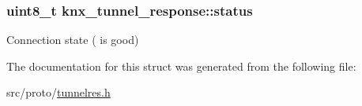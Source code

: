 \subsubsection[{\texorpdfstring{status}{status}}]{\setlength{\rightskip}{0pt plus 5cm}uint8\+\_\+t knx\+\_\+tunnel\+\_\+response\+::status}\hypertarget{structknx__tunnel__response_ac646034c64b6083aa21e49c22e1d0e50}{}\label{structknx__tunnel__response_ac646034c64b6083aa21e49c22e1d0e50}
Connection state ({} is good) 

The documentation for this struct was generated from the following file\+:\begin{DoxyCompactItemize}
\item 
src/proto/\hyperlink{tunnelres_8h}{tunnelres.\+h}\end{DoxyCompactItemize}
